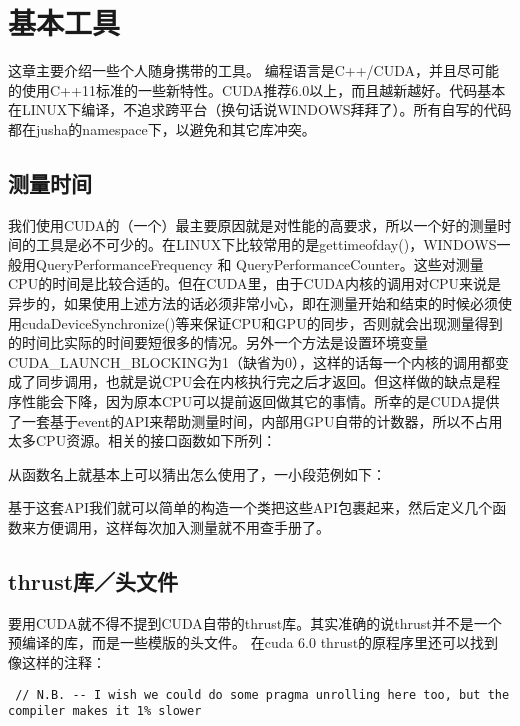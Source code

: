 \chapter{基本工具}

这章主要介绍一些个人随身携带的工具。 编程语言是C++/CUDA，并且尽可能的使用C++11标准的一些新特性。CUDA推荐6.0以上，而且越新越好。代码基本在LINUX下编译，不追求跨平台（换句话说WINDOWS拜拜了）。所有自写的代码都在jusha的namespace下，以避免和其它库冲突。

\section{测量时间}
我们使用CUDA的（一个）最主要原因就是对性能的高要求，所以一个好的测量时间的工具是必不可少的。在LINUX下比较常用的是gettimeofday()，WINDOWS一般用QueryPerformanceFrequency 和 QueryPerformanceCounter。这些对测量CPU的时间是比较合适的。但在CUDA里，由于CUDA内核的调用对CPU来说是异步的，如果使用上述方法的话必须非常小心，即在测量开始和结束的时候必须使用cudaDeviceSynchronize()等来保证CPU和GPU的同步，否则就会出现测量得到的时间比实际的时间要短很多的情况。另外一个方法是设置环境变量CUDA\_LAUNCH\_BLOCKING为1（缺省为0），这样的话每一个内核的调用都变成了同步调用，也就是说CPU会在内核执行完之后才返回。但这样做的缺点是程序性能会下降，因为原本CPU可以提前返回做其它的事情。所幸的是CUDA提供了一套基于event的API来帮助测量时间，内部用GPU自带的计数器，所以不占用太多CPU资源。相关的接口函数如下所列：
\myvspace


从函数名上就基本上可以猜出怎么使用了，一小段范例如下：
\myvspace

 
基于这套API我们就可以简单的构造一个类把这些API包裹起来，然后定义几个函数来方便调用，这样每次加入测量就不用查手册了。


\section{thrust库／头文件}

要用CUDA就不得不提到CUDA自带的thrust库。其实准确的说thrust并不是一个预编译的库，而是一些模版的头文件。
在cuda 6.0 thrust的原程序里还可以找到像这样的注释：

\begin{lstlisting}
 // N.B. -- I wish we could do some pragma unrolling here too, but the compiler makes it 1% slower
\end{lstlisting}
 
